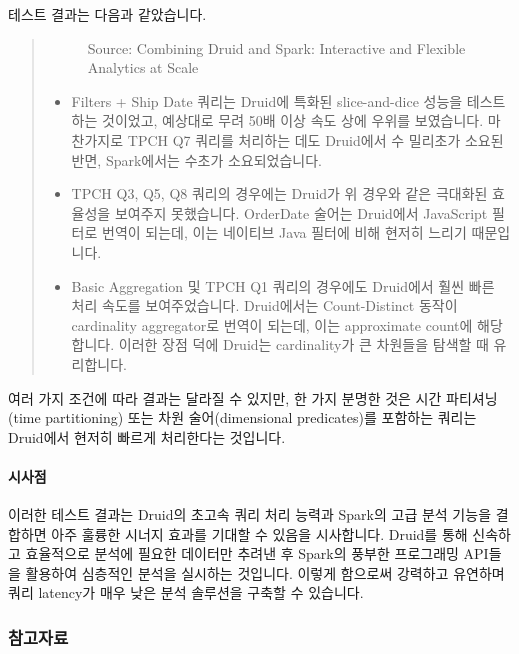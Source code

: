 \documentclass[letterpaper,10pt,english]{sphinxmanual}
\begin{document}
테스트 결과는 다음과 같았습니다.
\begin{quote}

\begin{figure}[H]
\centering
\capstart

\noindent{}
\caption{Source: Combining Druid and Spark: Interactive and Flexible Analytics at Scale}\label{\detokenize{discovery/part01/druid_tests:id19}}\end{figure}
\begin{itemize}
\item {} 
Filters + Ship Date 쿼리는 Druid에 특화된 slice-and-dice 성능을 테스트하는 것이었고, 예상대로 무려 50배 이상 속도 상에 우위를 보였습니다. 마찬가지로 TPCH Q7 쿼리를 처리하는 데도 Druid에서 수 밀리초가 소요된 반면, Spark에서는 수초가 소요되었습니다.

\item {} 
TPCH Q3, Q5, Q8 쿼리의 경우에는 Druid가 위 경우와 같은 극대화된 효율성을 보여주지 못했습니다. OrderDate 술어는 Druid에서 JavaScript 필터로 번역이 되는데, 이는 네이티브 Java 필터에 비해 현저히 느리기 때문입니다.

\item {} 
Basic Aggregation 및 TPCH Q1 쿼리의 경우에도 Druid에서 훨씬 빠른 처리 속도를 보여주었습니다. Druid에서는 Count-Distinct 동작이 cardinality aggregator로 번역이 되는데, 이는 approximate count에 해당합니다. 이러한 장점 덕에 Druid는 cardinality가 큰 차원들을 탐색할 때 유리합니다.

\end{itemize}
\end{quote}

여러 가지 조건에 따라 결과는 달라질 수 있지만, 한 가지 분명한 것은 시간 파티셔닝(time partitioning) 또는 차원 술어(dimensional predicates)를 포함하는 쿼리는 Druid에서 현저히 빠르게 처리한다는 것입니다.


\paragraph{시사점}
\label{\detokenize{discovery/part01/druid_tests:id11}}
이러한 테스트 결과는 Druid의 초고속 쿼리 처리 능력과 Spark의 고급 분석 기능을 결합하면 아주 훌륭한 시너지 효과를 기대할 수 있음을 시사합니다. Druid를 통해 신속하고 효율적으로 분석에 필요한 데이터만 추려낸 후 Spark의 풍부한 프로그래밍 API들을 활용하여 심층적인 분석을 실시하는 것입니다. 이렇게 함으로써 강력하고 유연하며 쿼리 latency가 매우 낮은 분석 솔루션을 구축할 수 있습니다.
\subsubsection*{참고자료}
\end{document}
